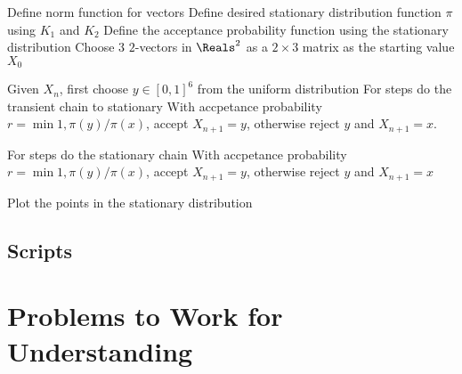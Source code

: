 \documentclass[12pt]{article}
\begin{document}
\begin{algorithm}[H]
  \DontPrintSemicolon

  Define norm function for vectors\;
  Define desired stationary distribution function \( \pi \) using
  \( K_1 \) and \( K_2 \)\;
  Define the acceptance probability function using the stationary
  distribution\;
  Choose $3$ $2$-vectors in \( \Reals^2 \) as a $2 \times 3$ matrix
  as the starting value \( X_0 \)\;

  Given \( X_n \), first choose \( y \in [0,1]^6
  \) from the uniform distribution\;
  For \cS steps do the transient chain to stationary\;
  With accpetance probability \( r = \min{1, \pi(y)/\pi(x)} \),
  accept \( X_{n+1} = y \), otherwise reject \( y \) and \( X_{n+1} = x \).

  For \sS steps do the  stationary chain\;
  With accpetance probability \( r = \min{1, \pi(y)/\pi(x)} \),
  accept \( X_{n+1} = y \), otherwise reject \( y \) and \( X_{n+1} =
  x \)\;

  Plot the points in the stationary distribution\;
\end{algorithm}
\subsection*{Scripts}



\hr

\section*{Problems to Work for Understanding}
\renewcommand{\theexerciseseries}{}
\renewcommand{\theexercise}{\arabic{exercise}}
\end{document}
